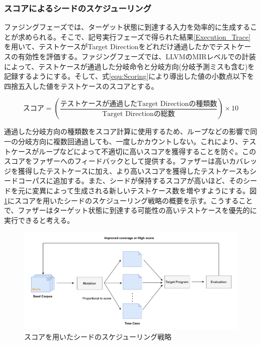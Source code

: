 \subsubsection{スコアによるシードのスケジューリング}
ファジングフェーズでは、ターゲット状態に到達する入力を効率的に生成することが求められる。そこで、記号実行フェーズで得られた結果\ref{Execution_Trace}を用いて、テストケースがTarget Directionをどれだけ通過したかでテストケースの有効性を評価する。ファジングフェーズでは、LLVMのMIRレベルでの計装によって、テストケースが通過した分岐命令と分岐方向(分岐予測ミスも含む)を記録するようにする。そして、式\ref{equ:Scoring}により導出した値の小数点以下を四捨五入した値をテストケースのスコアとする。

\begin{equation}
\text{スコア} = \left( \frac{\text{テストケースが通過したTarget Directionの種類数}}
{\text{Target Directionの総数}} \right) \times 10
  \label{equ:Scoring}
\end{equation}
\vspace{1em}

通過した分岐方向の種類数をスコア計算に使用するため、ループなどの影響で同一の分岐方向に複数回通過しても、一度しかカウントしない。これにより、テストケースがループなどによって不適切に高いスコアを獲得することを防ぐ。このスコアをファザーへのフィードバックとして提供する。ファザーは高いカバレッジを獲得したテストケースに加え、より高いスコアを獲得したテストケースもシードコーパスに追加する。また、シードが保持するスコアが高いほど、そのシードを元に変異によって生成される新しいテストケース数を増やすようにする。図\ref{fig:seed_schedule}にスコアを用いたシードのスケジューリング戦略の概要を示す。こうすることで、ファザーはターゲット状態に到達する可能性の高いテストケースを優先的に実行できると考える。

\begin{figure}[tb]
  \centering
  \includegraphics[width=\linewidth]{img/seed_schedule.drawio.pdf}
  \caption{スコアを用いたシードのスケジューリング戦略}\label{fig:seed_schedule}
\end{figure}







